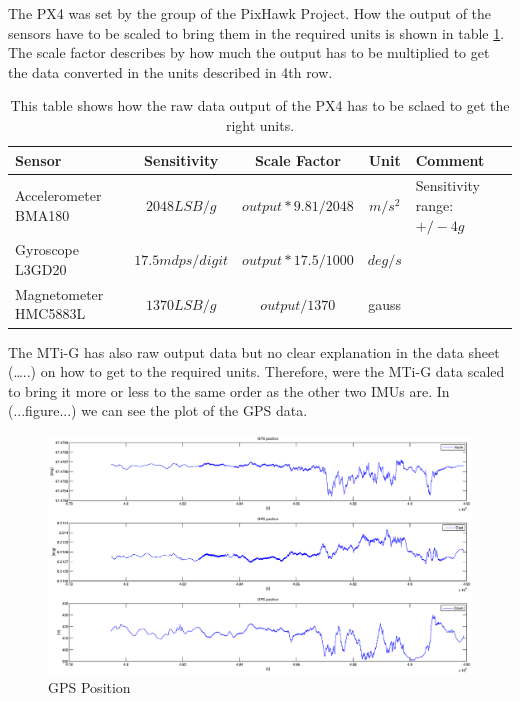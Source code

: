 The PX4 was set by the group of the PixHawk Project. How the output of the sensors have to be scaled to bring them in the required units is shown in table \ref{ct_units_PX4}. The scale factor describes by how much the output has to be multiplied to get the data converted in the units described in 4th row.
\begin{table}[h]
\centering
\begin{tabular}{|p{2.5 cm}|c|c|c|p{3 cm}|}
 \hline
 Sensor & Sensitivity & Scale Factor & Unit & Comment \\
 \hline
 Accelerometer BMA180 & $2048 LSB/g$ & $output*9.81/2048$ & $m/s^2$ &     Sensitivity range: $+/- 4 g$ \\
 \hline
 Gyroscope L3GD20 & $17.5 mdps/digit$ & $output*17.5/1000$ & $deg/s$ &   \\
 \hline
 Magnetometer HMC5883L & $1370 LSB/g$ & $output/1370$ & gauss &   \\
\hline
\end {tabular}
\caption{This table shows how the raw data output of the PX4 has to be sclaed to get the right units.}
\label{ct_units_PX4}
\end{table}
The MTi-G has also raw output data but no clear explanation in the data sheet (…..) on how to get to the required units. Therefore, were the MTi-G data scaled to bring it more or less to the same order as the other two IMUs are.
In (...figure...) we can see the plot of the GPS data.
\begin{figure}[h]
\begin{center}
\includegraphics[width=1.2\textwidth]{pictures/ct_pos.eps}
\caption{GPS Position}
\label{ct_pos}
\end{center}
\end{figure}
